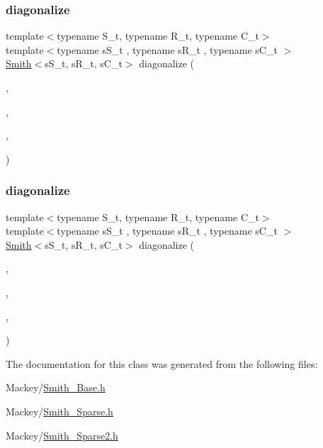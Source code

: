 \subsubsection{\texorpdfstring{diagonalize}{diagonalize}\hspace{0.1cm}{\footnotesize\ttfamily [1/2]}}
{\footnotesize\ttfamily template$<$typename S\+\_\+t, typename R\+\_\+t, typename C\+\_\+t$>$ \\
template$<$typename s\+S\+\_\+t , typename s\+R\+\_\+t , typename s\+C\+\_\+t $>$ \\
\hyperlink{classMackey_1_1Smith}{Smith}$<$s\+S\+\_\+t, s\+R\+\_\+t, s\+C\+\_\+t$>$ diagonalize (\begin{DoxyParamCaption}\item[{const s\+S\+\_\+t \&}]{,  }\item[{bool}]{,  }\item[{bool}]{,  }\item[{bool}]{ }\end{DoxyParamCaption})\hspace{0.3cm}{\ttfamily [friend]}}

\mbox{\label{classMackey_1_1SmithSparse_a020186c97759855bd063eeaaf0a17351}} 
\subsubsection{\texorpdfstring{diagonalize}{diagonalize}\hspace{0.1cm}{\footnotesize\ttfamily [2/2]}}
{\footnotesize\ttfamily template$<$typename S\+\_\+t, typename R\+\_\+t, typename C\+\_\+t$>$ \\
template$<$typename s\+S\+\_\+t , typename s\+R\+\_\+t , typename s\+C\+\_\+t $>$ \\
\hyperlink{classMackey_1_1Smith}{Smith}$<$s\+S\+\_\+t, s\+R\+\_\+t, s\+C\+\_\+t$>$ diagonalize (\begin{DoxyParamCaption}\item[{const s\+S\+\_\+t \&}]{,  }\item[{bool}]{,  }\item[{bool}]{,  }\item[{bool}]{ }\end{DoxyParamCaption})\hspace{0.3cm}{\ttfamily [friend]}}



The documentation for this class was generated from the following files\+:\begin{DoxyCompactItemize}
\item 
Mackey/\hyperlink{Smith__Base_8h}{Smith\+\_\+\+Base.\+h}\item 
Mackey/\hyperlink{Smith__Sparse_8h}{Smith\+\_\+\+Sparse.\+h}\item 
Mackey/\hyperlink{Smith__Sparse2_8h}{Smith\+\_\+\+Sparse2.\+h}\end{DoxyCompactItemize}

